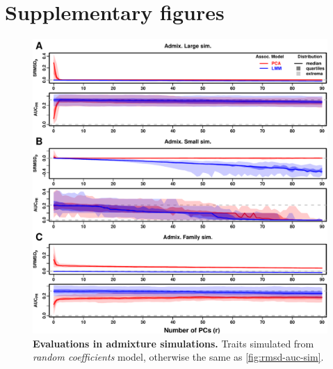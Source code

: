 \documentclass[11pt]{article}
\newcommand{\beginsupplement}{%
  \setcounter{table}{0}
  \renewcommand{\thetable}{S\arabic{table}}%
  \setcounter{figure}{0}
  \renewcommand{\thefigure}{S\arabic{figure}}%
  \setcounter{section}{0}
  \renewcommand{\thesection}{S\arabic{section}}%
  \setcounter{equation}{0}
  \renewcommand{\theequation}{S\arabic{equation}}%
  \setcounter{page}{1}
  \renewcommand{\thepage}{S\arabic{page}}%
}
\begin{document}

\printbibliography


\clearpage

\beginsupplement

\section{Supplementary figures}

\begin{figure}[bp!]
  \centering
  \includegraphics[width=\textwidth,height=\textheight,keepaspectratio]{rmsd-auc-sim.pdf}
  \caption{
    {\small 
      {\bf Evaluations in admixture simulations.}
      Traits simulated from \textit{random coefficients} model, otherwise the same as \cref{fig:rmsd-auc-sim}.
    }
  }
  \label{fig:rmsd-auc-sim-rc}
\end{figure}
\end{document}
